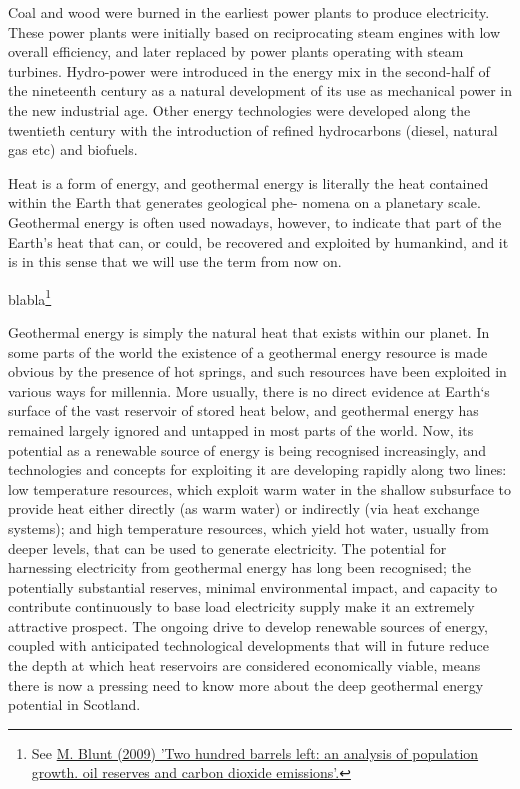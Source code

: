 Coal and wood were burned in the earliest power plants to produce electricity. These power plants were initially based on reciprocating steam engines with low overall efficiency, and later replaced by power plants operating with steam turbines. Hydro-power were introduced in the energy mix in the second-half of the nineteenth century as a natural development of its use as mechanical power in the new industrial age. Other energy technologies were developed along the twentieth century with the introduction of refined hydrocarbons (diesel, natural gas etc) and biofuels. 



Heat is a form of energy, and geothermal energy is literally the
heat contained within the Earth that generates geological phe-
nomena on a planetary scale. Geothermal energy is often used
nowadays, however, to indicate that part of the Earth’s heat
that can, or could, be recovered and exploited by humankind,
and it is in this sense that we will use the term from now on.




blabla\footnote{See \href{https://www.imperial.ac.uk/people/r.bryan/document/2407/200barrelsleft2009/?200barrelsleft2009.pdf}{M. Blunt (2009) 'Two hundred barrels left: an analysis of population growth. oil reserves and carbon dioxide emissions'.}}


Geothermal energy is simply the natural heat that exists within our planet. In some parts of the
world the existence of a geothermal energy resource is made obvious by the presence of hot
springs, and such resources have been exploited in various ways for millennia. More usually,
there is no direct evidence at Earth‘s surface of the vast reservoir of stored heat below, and
geothermal energy has remained largely ignored and untapped in most parts of the world. Now,
its potential as a renewable source of energy is being recognised increasingly, and technologies
and concepts for exploiting it are developing rapidly along two lines: low temperature resources,
which exploit warm water in the shallow subsurface to provide heat either directly (as warm
water) or indirectly (via heat exchange systems); and high temperature resources, which yield
hot water, usually from deeper levels, that can be used to generate electricity.
The potential for harnessing electricity from geothermal energy has long been recognised; the
potentially substantial reserves, minimal environmental impact, and capacity to contribute
continuously to base load electricity supply make it an extremely attractive prospect. The
ongoing drive to develop renewable sources of energy, coupled with anticipated technological
developments that will in future reduce the depth at which heat reservoirs are considered
economically viable, means there is now a pressing need to know more about the deep
geothermal energy potential in Scotland.






